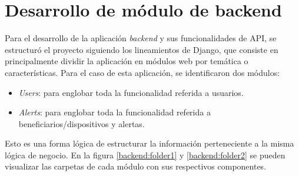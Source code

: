 \section{Desarrollo de módulo de backend}

Para el desarrollo de la aplicación \textit{backend} y sus funcionalidades de API, se estructuró el proyecto siguiendo los lineamientos de Django, que consiste en principalmente dividir la aplicación en módulos web por temática o características. Para el caso de esta aplicación, se identificaron dos módulos:
\begin{itemize}
	\item \textit{Users}: para englobar toda la funcionalidad referida a usuarios.
	\item \textit{Alerts}: para englobar toda la funcionalidad referida a beneficiarios/dispositivos y alertas.
\end{itemize}

Esto es una forma lógica de estructurar la información perteneciente a la misma lógica de negocio. En la figura \ref{backend:folder1} y \ref{backend:folder2} se pueden visualizar las carpetas de cada módulo con sus respectivos componentes.

